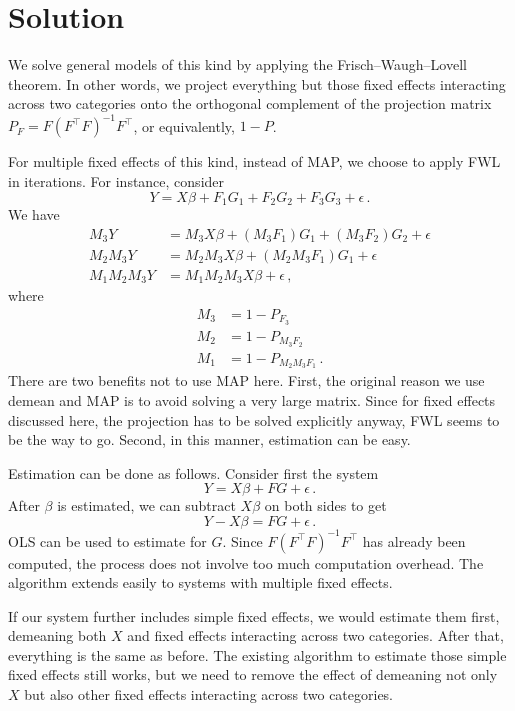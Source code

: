 \documentclass{tufte-handout}
\begin{document}
  \section{Solution}

  We solve general models of this kind by applying the
  Frisch--Waugh--Lovell theorem. In other words, we project everything
  but those fixed effects interacting across two categories onto the
  orthogonal complement of the projection matrix $P_F = F(F^\top F)^{-1}F^\top$,
  or equivalently, $1 - P$.

  For multiple fixed effects of this kind, instead of MAP, we choose to apply
  FWL in iterations. For instance, consider
  \[ Y = X \beta + F_1G_1 + F_2G_2 + F_3G_3 + \epsilon \, . \]
  We have
  \begin{align*}
    M_3Y &= M_3X \beta + (M_3F_1)G_1 + (M_3F_2)G_2 + \epsilon \\
    M_2M_3Y &= M_2M_3X \beta + (M_2M_3F_1)G_1 + \epsilon \\
    M_1M_2M_3Y &= M_1M_2M_3X \beta + \epsilon \, ,
  \end{align*}
  where
  \begin{align*}
    M_3 &= 1 - P_{F_3}\\
    M_2 &= 1 - P_{M_3 F_2} \\
    M_1 &= 1 - P_{M_2M_3 F_1} \, .
  \end{align*}
  There are two benefits not to use MAP here. First, the original reason we use 
  demean and MAP is to avoid solving a very large matrix. Since for fixed
  effects discussed here, the projection has to be solved explicitly anyway,
  FWL seems to be the way to go. Second, in this manner, estimation can be easy.

  Estimation can be done as follows. Consider first the system
  \[ Y = X \beta + F G + \epsilon \, . \]
  After $\beta$ is estimated, we can subtract $X \beta$ on both sides to get
  \[ Y - X \beta = F G + \epsilon \, . \]
  OLS can be used to estimate for $G$. Since $F(F^\top F)^{-1}F^\top$
  has already been computed, the process does not involve too much 
  computation overhead. The algorithm extends easily to systems with multiple
  fixed effects.

  If our system further includes simple fixed effects, we would estimate
  them first, demeaning both $X$ and fixed effects interacting across two 
  categories. After that, everything is the same as before.
  The existing algorithm to estimate those simple fixed effects still works,
  but we need to remove the effect of demeaning not only $X$ but also other
  fixed effects interacting across two categories.
\end{document}
